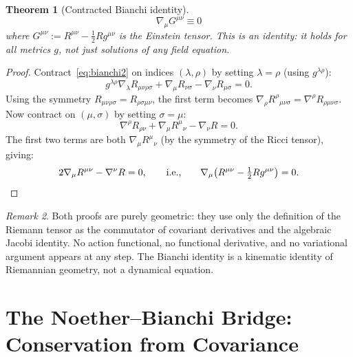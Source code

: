 \documentclass[12pt]{article}
\theoremstyle{plain}
\newtheorem{theorem}{Theorem}[section]
\theoremstyle{definition}
\theoremstyle{remark}
\newtheorem{remark}[theorem]{Remark}
\begin{document}
\begin{theorem}[Contracted Bianchi identity]\label{thm:contracted-bianchi}
\begin{equation}\label{eq:div-G}
\boxed{\nabla_\mu G^{\mu\nu} \equiv 0}
\end{equation}
where $G^{\mu\nu} := R^{\mu\nu} - \frac{1}{2}Rg^{\mu\nu}$ is the Einstein tensor. This is an \emph{identity}: it holds for all metrics $g$, not just solutions of any field equation.
\end{theorem}

\begin{proof}
Contract~\eqref{eq:bianchi2} on indices $(\lambda, \rho)$ by setting $\lambda = \rho$ (using $g^{\lambda\rho}$):
\begin{equation}
g^{\lambda\rho}\nabla_\lambda R_{\mu\nu\rho\sigma} + \nabla_\mu R_{\nu\sigma} - \nabla_\nu R_{\mu\sigma} = 0.
\end{equation}
Using the symmetry $R_{\mu\nu\rho\sigma} = R_{\rho\sigma\mu\nu}$, the first term becomes $\nabla_\rho R^\rho{}_{\mu\nu\sigma} = \nabla^\rho R_{\rho\mu\nu\sigma}$. Now contract on $(\mu, \sigma)$ by setting $\sigma = \mu$:
\begin{equation}
\nabla^\rho R_{\rho\nu} + \nabla_\mu R^\mu{}_\nu - \nabla_\nu R = 0.
\end{equation}
The first two terms are both $\nabla_\mu R^{\mu}{}_\nu$ (by the symmetry of the Ricci tensor), giving:
\begin{equation}
2\nabla_\mu R^{\mu\nu} - \nabla^\nu R = 0, \qquad\text{i.e.,}\qquad \nabla_\mu\!\left(R^{\mu\nu} - \tfrac{1}{2}Rg^{\mu\nu}\right) = 0.\qedhere
\end{equation}
\end{proof}

\begin{remark}\label{rmk:no-action-bianchi}
Both proofs are purely geometric: they use only the definition of the Riemann tensor as the commutator of covariant derivatives and the algebraic Jacobi identity. No action functional, no functional derivative, and no variational argument appears at any step. The Bianchi identity is a kinematic identity of Riemannian geometry, not a dynamical equation.
\end{remark}


\section{The Noether--Bianchi Bridge: Conservation from Covariance}
\label{sec:bridge}
\end{document}
